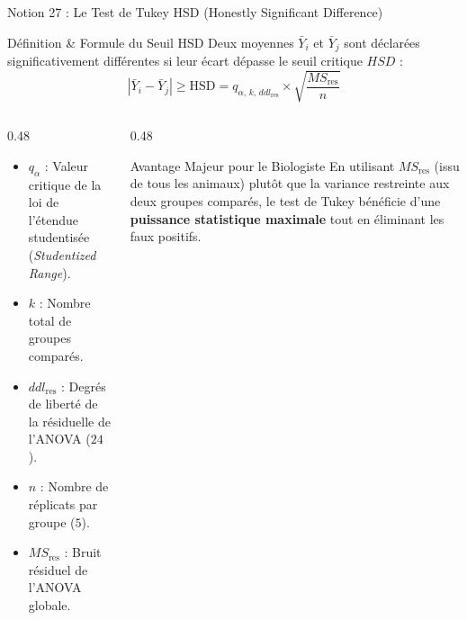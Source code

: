 \documentclass[aspectratio=169,10pt]{beamer}
\begin{document}
\begin{frame}{Notion 27 : Le Test de Tukey HSD (Honestly Significant Difference)}
  \begin{conceptbox}{Définition \& Formule du Seuil HSD}
    Deux moyennes $\bar{Y}_i$ et $\bar{Y}_j$ sont déclarées significativement différentes si leur écart dépasse le seuil critique $HSD$ :
    \begin{equation*}
      |\bar{Y}_i - \bar{Y}_j| \ge \text{HSD} = q_{\alpha, \, k, \, ddl_{\text{res}}} \times \sqrt{\frac{MS_{\text{res}}}{n}}
    \end{equation*}
  \end{conceptbox}

  \begin{columns}[onlytextwidth, T]
    \begin{column}{0.48\linewidth}
      \begin{itemize}
        \item $q_{\alpha}$ : Valeur critique de la loi de l'étendue studentisée (\textit{Studentized Range}).
        \item $k$ : Nombre total de groupes comparés.
        \item $ddl_{\text{res}}$ : Degrés de liberté de la résiduelle de l'ANOVA ($24$).
        \item $n$ : Nombre de réplicats par groupe ($5$).
        \item $MS_{\text{res}}$ : Bruit résiduel de l'ANOVA globale.
      \end{itemize}
    \end{column}
    \begin{column}{0.48\linewidth}
      \begin{biobox}{Avantage Majeur pour le Biologiste}
        En utilisant $MS_{\text{res}}$ (issu de tous les animaux) plutôt que la variance restreinte aux deux groupes comparés, le test de Tukey bénéficie d'une \textbf{puissance statistique maximale} tout en éliminant les faux positifs.
      \end{biobox}
    \end{column}
  \end{columns}
\end{frame}
\end{document}
